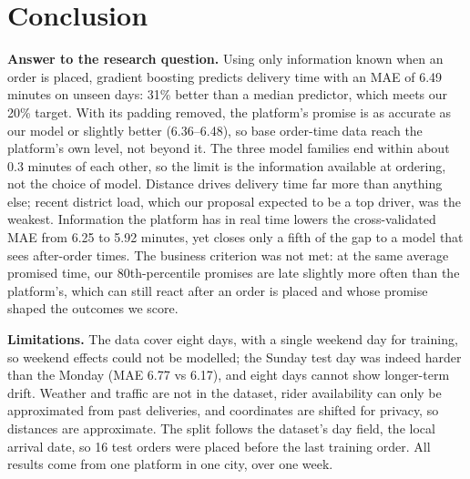 \section{Conclusion}

\textbf{Answer to the research question.} Using only information known when an order is placed,
gradient boosting predicts delivery time with an MAE of 6.49 minutes on unseen days: 31\% better than
a median predictor, which meets our 20\% target. With its padding removed, the platform's promise is as
accurate as our model or slightly better (6.36--6.48), so base order-time data reach the platform's own
level, not beyond it. The three model families end within about 0.3 minutes of each other, so the limit
is the information available at ordering, not the choice of model. Distance drives delivery time far
more than anything else; recent district load, which our proposal expected to be a top driver, was the
weakest. Information the platform has in real time lowers the cross-validated MAE from 6.25 to 5.92
minutes, yet closes only a fifth of the gap to a model that sees after-order times. The business
criterion was not met: at the same average promised time, our 80th-percentile promises are late slightly
more often than the platform's, which can still react after an order is placed and whose promise shaped
the outcomes we score.

\textbf{Limitations.} The data cover eight days, with a single weekend day for training, so weekend
effects could not be modelled; the Sunday test day was indeed harder than the Monday (MAE 6.77 vs 6.17),
and eight days cannot show longer-term drift. Weather and traffic are not in the dataset, rider
availability can only be approximated from past deliveries, and coordinates are shifted for privacy, so
distances are approximate. The split follows the dataset's day field, the local arrival date, so 16 test
orders were placed before the last training order. All results come from one platform in one city, over
one week.

